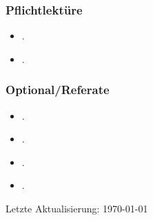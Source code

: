 \documentclass[abstract=on,parskip=full,headings=standardclasses,fontsize=11pt,paper=a4]{scrartcl}
\begin{document}
\subsubsection*{Pflichtlektüre}
\begin{itemize}
\item {}.
\item {}.
\end{itemize}
 
 
\subsubsection*{Optional/Referate}
\begin{itemize}
\item {}.
\item {}.
 \item {}.
 \item {}.
\end{itemize}

 


\sloppy
\renewcommand*{\bibfont}{\small}

\setlength{\bibitemsep}{0.2em} %
\printbibliography

\bigskip

\begin{center}
Letzte Aktualisierung: \today
\end{center}
\end{document}
